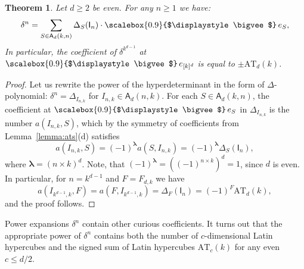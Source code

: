 \documentclass[12pt, reqno]{amsart}
\newtheorem{theorem}{Theorem}[section]
\theoremstyle{definition}
\newcommand{\dett}{\mathrm{det}}
\let\oldbigvee\bigvee
\renewcommand{\bigvee}{
  \mathop{
    \vcenter{
      \hbox{\scalebox{0.9}{$\displaystyle\oldbigvee$}}
    }
  }
}
\begin{document}
\begin{theorem}
    Let $d \ge 2$ be even. For any $n \ge 1$ we have:
    $$
        \delta^n = \sum_{S \in \mathsf{A}_{d}(k, n)} \Delta_{S}(\mathsf{I}_n) \cdot \bigvee e_S,
    $$
    In particular, the coefficient of $\delta^{k^{d-1}}$ at $\bigvee e_{[k]^d}$ is equal to $\pm \mathrm{AT}_d(k)$.
\end{theorem}
\begin{proof}
    Let us rewrite the power of the hyperdeterminant in the form of $\Delta$-polynomial: $\delta^{n} = \Delta_{I_{n, k}}$ for $I_{n,k} \in \mathsf{A}_d(n,k)$. For each $S \in \mathsf{A}_d(k, n)$, the coefficient at $\bigvee e_S$ in $\Delta_{I_{n,k}}$ is the number $a(I_{n, k}, S)$, which by the symmetry of coefficients from Lemma~\ref{lemma:ats}(d) satisfies
    $$a(I_{n,k}, S) = (-1)^{\pmb{\lambda}}a(S, I_{n,k}) = (-1)^{\pmb{\lambda}}\Delta_{S}(\mathsf{I}_n),$$ 
    where $\pmb{\lambda} = (n\times k)^d$. Note, that $(-1)^{\pmb{\lambda}} = ((-1)^{n \times k})^d = 1$, since $d$ is even.
    In particular, for $n = k^{d-1}$ and $F = F_{d,k}$ we have
    $$
    a(I_{k^{d-1}, k}, F) = a(F, I_{k^{d-1}, k}) = \Delta_{F}(\mathsf{I}_n) = (-1)^{F} \mathrm{AT}_d(k),
    $$
    and the proof follows.
\end{proof}

Power expansions $\delta^{n}$ contain other curious coefficients.
It turns out that the appropriate power of $\delta^n$ contains both the number of $c$-dimensional Latin hypercubes and the signed sum of Latin hypercubes $\mathrm{AT}_c(k)$ for any even $c \le d/2$. 
\end{document}
